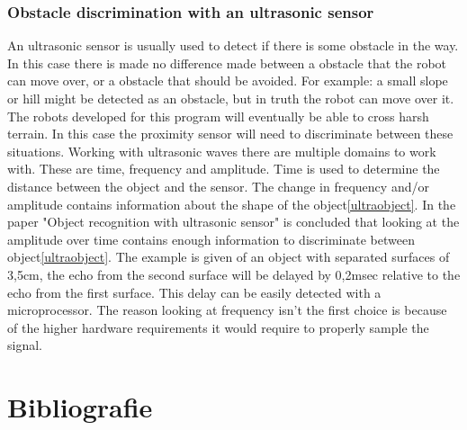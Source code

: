 \documentclass[10pt,a4paper]{article}
\begin{document}
\subsubsection{Obstacle discrimination with an ultrasonic sensor}
An ultrasonic sensor is usually used to detect if there is some obstacle in the way. In this case there is made no difference made between a obstacle that the robot can move over, or a obstacle that should be avoided. For example: a small slope or hill might be detected as an obstacle, but in truth the robot can move over it. The robots developed for this program will eventually be able to cross harsh terrain. In this case the proximity sensor will need to discriminate between these situations. Working with ultrasonic waves there are multiple domains to work with. These are time, frequency and amplitude. Time is used to determine the distance between the object and the sensor. The change in frequency and/or amplitude contains information about the shape of the object\ref{ultraobject}. 
In the paper "Object recognition with ultrasonic sensor" is concluded 
that looking at the amplitude over time contains enough information to discriminate between object\ref{ultraobject}. The example is given of an object with separated surfaces of 3,5cm, the echo from the second surface will be delayed by 0,2msec relative to the echo from the first surface. This delay can be easily detected with a microprocessor. The reason looking at frequency isn't the first choice is because of the higher hardware requirements it would require to properly sample the signal. 
\\

\newpage

\section{Bibliografie}


\end{document}
